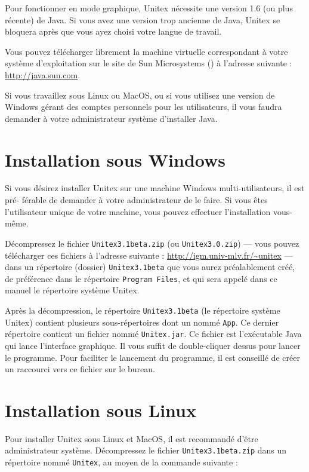 \bigskip
\noindent Pour fonctionner en mode graphique, Unitex nécessite une version 1.6 (ou plus récente)
de Java. Si vous avez une version trop ancienne de Java, Unitex se bloquera après que vous
ayez choisi votre langue de travail.


\bigskip
\noindent Vous pouvez télécharger librement la machine virtuelle correspondant à votre 
système d’exploitation sur le site de Sun Microsystems (\cite{site-java}) à l’adresse suivante : 
\url{http://java.sun.com}.

\bigskip
\noindent Si vous travaillez sous Linux ou MacOS, ou si vous
utilisez une version de Windows gérant des comptes personnels pour les utilisateurs, il vous
faudra demander à votre administrateur système d’installer Java.



\section{Installation sous Windows}
    Si vous désirez installer Unitex sur une machine Windows multi-utilisateurs, il est pré-
férable de demander à votre administrateur de le faire. Si vous êtes l’utilisateur unique de
votre machine, vous pouvez effectuer l’installation vous-même.

\bigskip
\noindent Décompressez le fichier  \verb+Unitex3.1beta.zip+ (ou \verb+Unitex3.0.zip+)
--- vous pouvez télécharger ces fichiers à l’adresse suivante : \url{http://igm.univ-mlv.fr/~unitex} ---
dans un répertoire (dossier) \verb+Unitex3.1beta+ que vous aurez préalablement créé,
de préférence dans le répertoire  \verb+Program Files+, et qui sera appelé dans ce manuel
le répertoire système Unitex.

\bigskip
\noindent Après la décompression, le répertoire \verb+Unitex3.1beta+
(le répertoire système Unitex) contient plusieurs
sous-répertoires dont un nommé \verb+App+. Ce dernier répertoire contient un fichier nommé
\verb+Unitex.jar+.
 Ce fichier est l’exécutable Java qui lance l’interface graphique. Il vous suffit de double-cliquer
dessus pour lancer le programme.
Pour faciliter le lancement du programme, il est conseillé de créer un raccourci vers ce fichier sur le bureau.


\section{Installation sous Linux}
Pour installer Unitex sous Linux et MacOS, il est recommandé d’être administrateur système. Décompressez le fichier \verb+Unitex3.1beta.zip+ dans un répertoire nommé
\verb+Unitex+, au moyen de la commande suivante :


